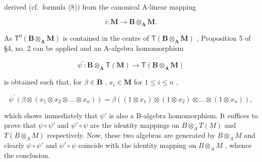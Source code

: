 derived (cf.~formula (8)) from the canonical A-linear mapping

\[
i: \mathbf {M} \rightarrow \mathbf {B} \otimes_ {\mathbf {A}} \mathbf {M}.
\]

As \(\mathsf{T}^0 (\mathbf{B}\otimes_{\mathbf{A}}\mathbf{M})\) is contained in the centre of \(\mathsf{T}(\mathbf{B}\otimes_{\mathbf{A}}\mathbf{M})\) , Proposition 5 of §4, no. 2 can be applied and an A-algebra homomorphism

\[
\psi^ {\prime}: \mathbf {B} \otimes_ {\mathbf {A}} \mathsf {T} (\mathbf {M}) \rightarrow \mathsf {T} (\mathbf {B} \otimes_ {\mathbf {A}} \mathbf {M})
\]

is obtained such that, for \(\beta \in \mathbf{B}\) , \(x_{i} \in \mathbf{M}\) for \(1 \leqslant i \leqslant n\) ,

\[
\psi^ {\prime} (\beta \otimes (x _ {1} \otimes x _ {2} \otimes \dots \otimes x _ {n})) = \beta ((1 \otimes x _ {1}) \otimes (1 \otimes x _ {2}) \otimes \dots \otimes (1 \otimes x _ {n})),
\]

which shows immediately that \(\psi'\) is also a B-algebra homomorphism. It suffices to prove that \(\psi \circ \psi'\) and \(\psi' \circ \psi\) are the identity mappings on \(B \otimes_{A} T(M)\) and \(T(B \otimes_{A} M)\) respectively. Now, these two algebras are generated by \(B \otimes_{A} M\) and clearly \(\psi \circ \psi'\) and \(\psi' \circ \psi\) coincide with the identity mapping on \(B \otimes_{A} M\) , whence the conclusion.

